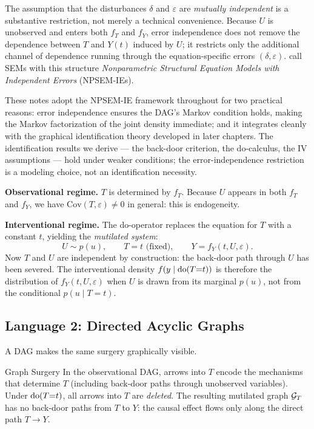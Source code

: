 \documentclass[master.tex]{subfiles}
\begin{document}
\begin{remark}
\label{w1:rem:npsem-ie}
The assumption that the disturbances $\delta$ and $\varepsilon$ are
\emph{mutually independent} is a substantive restriction, not merely a
technical convenience.  Because $U$ is unobserved and enters both
$f_T$ and $f_Y$, error independence does not remove the dependence
between $T$ and $Y(t)$ induced by $U$; it restricts only the additional
channel of dependence running through the equation-specific errors
$(\delta,\varepsilon)$.  \citet{richardson2014ace} call SEMs with this
structure \emph{Nonparametric Structural Equation Models with Independent
Errors} (NPSEM-IEs).

These notes adopt the NPSEM-IE framework throughout for two practical
reasons: error independence ensures the DAG's Markov condition holds,
making the Markov factorization of the joint density immediate; and it
integrates cleanly with the graphical identification theory developed in
later chapters.  The identification results we derive --- the back-door
criterion, the do-calculus, the IV assumptions --- hold under weaker
conditions; the error-independence restriction is a modeling choice, not
an identification necessity.
\end{remark}

\medskip
\noindent\textbf{Observational regime.}
$T$ is determined by $f_T$.  Because $U$ appears in both $f_T$ and $f_Y$,
we have $\mathrm{Cov}(T,\varepsilon) \neq 0$ in general: this is
endogeneity.

\medskip
\noindent\textbf{Interventional regime.}
The do-operator replaces the equation for $T$ with a constant $t$, yielding
the \emph{mutilated system}:
\[
  U \sim p(u), \qquad T = t \text{ (fixed)}, \qquad Y = f_Y(t, U, \varepsilon).
\]
Now $T$ and $U$ are independent by construction: the back-door path through
$U$ has been severed.  The interventional density $f(y \mid \mathrm{do}(T{=}t))$
is therefore the distribution of $f_Y(t, U, \varepsilon)$ when $U$ is drawn
from its marginal $p(u)$, not from the conditional $p(u \mid T{=}t)$.

\subsection{Language 2: Directed Acyclic Graphs}

A DAG makes the same surgery graphically visible.

\begin{defn}{Graph Surgery}
In the observational DAG, arrows into $T$ encode the mechanisms that
determine $T$ (including back-door paths through unobserved variables).
Under $\mathrm{do}(T{=}t)$, all arrows into $T$ are \emph{deleted}.  The resulting
mutilated graph $\mathcal{G}_T$ has no back-door paths from $T$ to $Y$:
the causal effect flows only along the direct path $T \to Y$.
\end{defn}
\end{document}
